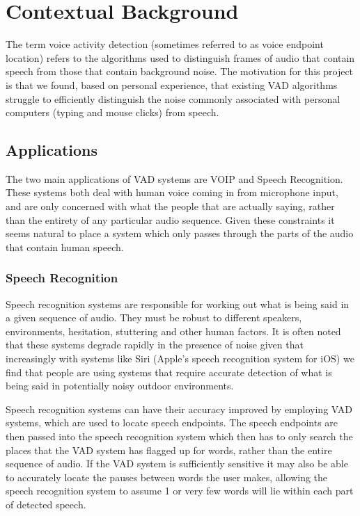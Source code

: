 \documentclass[ %
                    author={Sam Phippen},
                supervisor={Dr. Rafal Bogacz},
                     title={Real time voice activity detectors in noisy personal computing environments},
                  subtitle={},
                    degree={MEng},
                      year={2012} ]{thesis}
\begin{document}
\mainmatter


\chapter{Contextual Background}
\label{chap:context}

\vspace{1cm}

The term voice activity detection (sometimes referred to as voice endpoint
location\cite{Tuske}) refers to the algorithms used to distinguish frames of
audio that contain speech from those that contain background
noise\cite{ramirez}. The motivation for this project is that we found, based on
personal experience, that existing VAD algorithms struggle to efficiently
distinguish the noise commonly associated with personal computers (typing and
mouse clicks) from speech.

\section{Applications}

The two main applications of VAD systems are VOIP and Speech Recognition. These
systems both deal with human voice coming in from microphone input, and are
only concerned with what the people that are actually saying, rather than the
entirety of any particular audio sequence. Given these constraints it seems
natural to place a system which only passes through the parts of the audio that
contain human speech.

\subsection{Speech Recognition}

Speech recognition systems are responsible for working out what is being said
in a given sequence of audio. They must be robust to different speakers,
environments, hesitation, stuttering and other human factors. It is often noted
that these systems degrade rapidly in the presence of noise\cite{Moreno} given
that increasingly with systems like Siri\texttrademark\cite{siri} (Apple's
speech recognition system for iOS\texttrademark) we find that people are using
systems that require accurate detection of what is being said in potentially
noisy outdoor environments.

Speech recognition systems can have their accuracy improved\cite{shin} by
employing VAD systems, which are used to locate speech endpoints. The speech
endpoints are then passed into the speech recognition system which then has to
only search the places that the VAD system has flagged up for words, rather
than the entire sequence of audio. If the VAD system is sufficiently sensitive
it may also be able to accurately locate the pauses between words the user
makes, allowing the speech recognition system to assume 1 or very few words
will lie within each part of detected speech.
\end{document}

